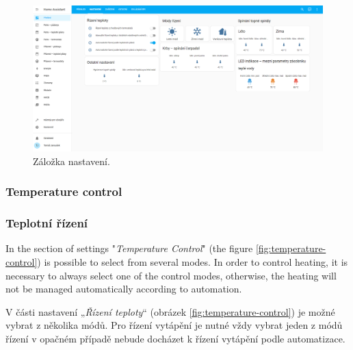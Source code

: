 \begin{Czech}
\begin{figure}[H]
    \centering
    \includegraphics[width=1\textwidth]{pictures/czech/software/settings-tab.png}
    \caption{Záložka nastavení.}
    \label{fig:settings-tab}
\end{figure}
\end{Czech}


\begin{English}
\subsubsection{Temperature control}
\end{English}

\begin{Czech}
\subsubsection{Teplotní řízení}
\end{Czech}
\label{sec:temperature-control}


\begin{English}
In the section of settings "\textit{Temperature Control}" (the figure \ref{fig:temperature-control}) is possible to select from several modes. In order to control heating, it is necessary to always select one of the control modes, otherwise, the heating will not be managed automatically according to automation.
\end{English}

\begin{Czech}
V části nastavení „\textit{Řízení teploty}“ (obrázek \ref{fig:temperature-control}) je možné vybrat z  několika módů. Pro řízení vytápění je nutné vždy vybrat jeden z módů řízení v opačném případě nebude docházet k řízení vytápění podle automatizace.
\end{Czech}


